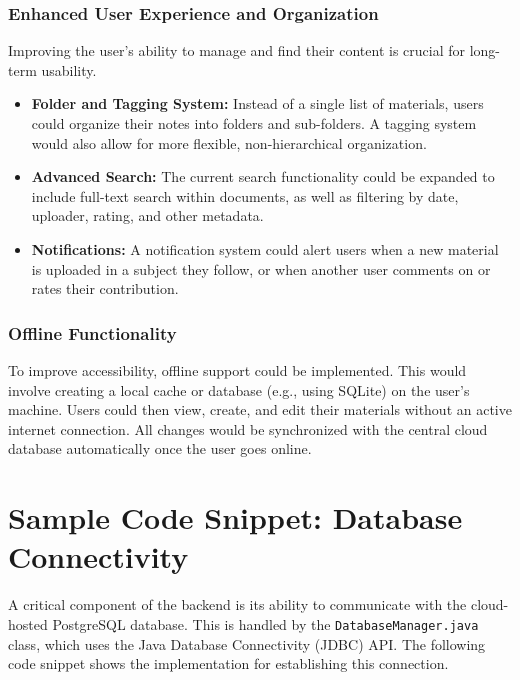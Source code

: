 \documentclass[12pt, a4paper]{report}
\begin{document}
\subsection{Enhanced User Experience and Organization}
Improving the user's ability to manage and find their content is crucial for long-term usability.
\begin{itemize}
    \item \textbf{Folder and Tagging System:} Instead of a single list of materials, users could organize their notes into folders and sub-folders. A tagging system would also allow for more flexible, non-hierarchical organization.
    \item \textbf{Advanced Search:} The current search functionality could be expanded to include full-text search within documents, as well as filtering by date, uploader, rating, and other metadata.
    \item \textbf{Notifications:} A notification system could alert users when a new material is uploaded in a subject they follow, or when another user comments on or rates their contribution.
\end{itemize}

\subsection{Offline Functionality}
To improve accessibility, offline support could be implemented. This would involve creating a local cache or database (e.g., using SQLite) on the user's machine. Users could then view, create, and edit their materials without an active internet connection. All changes would be synchronized with the central cloud database automatically once the user goes online.

\appendix
\chapter{Sample Code Snippet: Database Connectivity}

A critical component of the backend is its ability to communicate with the cloud-hosted PostgreSQL database. This is handled by the \texttt{DatabaseManager.java} class, which uses the Java Database Connectivity (JDBC) API. The following code snippet shows the implementation for establishing this connection.
\end{document}
